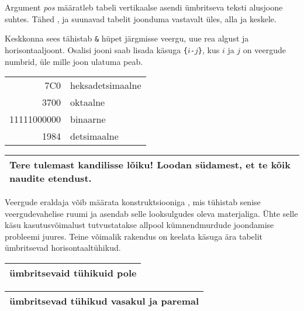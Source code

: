 Argument \emph{pos} määratleb tabeli vertikaalse asendi ümbritseva
teksti alusjoone suhtes. Tähed ,  ja  suunavad
tabelit joonduma vastavalt üles, alla ja keskele.

Keskkonna  sees tähistab \texttt{\&}
hüpet järgmisse veergu, \ci{\bs} uue rea algust ja 
horisontaaljoont. Osalisi jooni saab lisada käsuga
\texttt{\{}$i$\texttt{-}$j$\texttt{\}}, kus $i$ ja $j$ on
veergude numbrid, üle mille joon ulatuma peab.

\begin{example}
\begin{tabular}{|r|l|}
\hline
7C0 & heksadetsimaalne\\
3700 & oktaalne \\ \cline{2-2}
11111000000 & binaarne \\
\hline \hline
1984 & detsimaalne\\
\hline
\end{tabular}
\end{example}

\begin{example}
\begin{tabular}{|p{4.7cm}|}
\hline
Tere tulemast kandilisse lõiku!
Loodan südamest, et te kõik
naudite etendust.\\
\hline
\end{tabular}
\end{example}

Veergude eraldaja võib määrata konstruktsiooniga
, mis tühistab senise veergudevahelise ruumi ja asendab
selle looksulgudes oleva materjaliga. Ühte selle käsu kasutusvõimalust
tutvustatakse allpool kümnendmurdude joondamise probleemi juures. Teine
võimalik rakendus on keelata käsuga  ära tabelit ümbritsevad
horisontaaltühikud.

\begin{example}
\begin{tabular}{@{} l @{}}
\hline
ümbritsevaid tühikuid pole\\
\hline
\end{tabular}
\end{example}

\begin{example}
\begin{tabular}{l}
\hline
ümbritsevad tühikud
vasakul ja paremal\\
\hline
\end{tabular}
\end{example}

